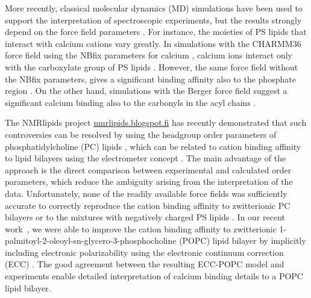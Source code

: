 \documentclass[journal=jpcbfk,manuscript=article]{achemso}
\begin{document}
More recently, classical molecular dynamics (MD) simulations
have been used to support the interpretation of spectroscopic experiments,
but the results strongly depend on the force field parameters \cite{boettcher11,kucerka14,melcrova16,hallock18,valentine18}.
For instance, the moieties of PS lipids that interact with calcium cations vary greatly.
In simulations with the CHARMM36 force field \cite{klauda10,venable13} using the NBfix parameters for calcium \cite{kim16}, 
calcium ions interact only with the carboxylate group of PS lipids \cite{valentine18}.
However, the same force field without the NBfix parameters, gives a significant binding affinity also to the phosphate region \cite{hallock18}.
On the other hand, simulations with the Berger force field \cite{berger97,mukhopadhyay04}
suggest a significant calcium binding also to the carbonyls in the acyl chains \cite{melcrova16}.

The NMRlipids project \url{nmrlipids.blogspot.fi} has recently demonstrated
that such controversies can be resolved by using the headgroup order parameters
of phosphatidylcholine (PC) lipids \cite{catte16, NMRlipidsIV}, which can
be related to cation binding affinity to lipid bilayers using the electrometer
concept \cite{akutsu81,altenbach84,seelig87}. The main advantage of the approach
is the direct comparison between experimental and calculated order parameters,
which reduce the ambiguity arising from the interpretation of the data.
Unfortunately, none of the readily available force fields was sufficiently accurate to correctly reproduce the
cation binding affinity to zwitterionic PC bilayers \cite{catte16} or to the
mixtures with negatively charged PS lipids \cite{NMRlipidsIV}.
In our recent work~\cite{melcr18}, we were able to improve the cation binding affinity
to zwitterionic 1-palmitoyl-2-oleoyl-sn-glycero-3-phosphocholine (POPC) lipid bilayer
by implicitly including electronic polarizability using the electronic continuum
correction (ECC) \cite{leontyev09}. The good agreement between the resulting ECC-POPC
model and experiments enable detailed interpretation of calcium binding details to a POPC lipid bilayer.

\end{document}
